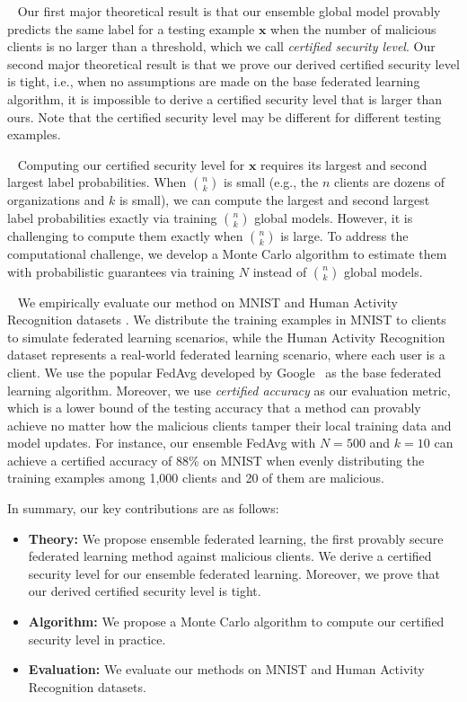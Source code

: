 \documentclass[letterpaper]{article} %
\newcommand{\myparatight}[1]{\smallskip\noindent{\bf {#1}:}~}
\begin{document}
\myparatight{Theory} Our first major theoretical result is that our ensemble global model provably predicts the same label for a testing example $\mathbf{x}$ when the number of malicious clients is no larger than a threshold, which we call \emph{certified security level}.  Our second major theoretical result is that we prove our derived certified security level is tight, i.e., when no assumptions are made on the base federated learning algorithm, it is impossible to derive a certified security level that is larger than ours. Note that the certified security level may be different for different testing examples.

\myparatight{Algorithm} Computing our certified security level for $\mathbf{x}$ requires its largest and second largest label probabilities. When ${n \choose k}$ is small (e.g., the $n$ clients are dozens of organizations \cite{kairouz2019advances} and $k$ is small), we can compute the largest and second largest label probabilities exactly via training ${n \choose k}$ global models.
However, it is challenging to compute them exactly when ${n \choose k}$ is large. To address the computational challenge, we develop a Monte Carlo algorithm to estimate them with probabilistic guarantees via training $N$ instead of ${n \choose k}$ global models.

\myparatight{Evaluation} We empirically evaluate our method on MNIST \cite{lecun2010mnist} and Human Activity Recognition datasets \cite{anguita2013public}. We distribute the training examples in MNIST to clients to simulate  federated learning scenarios, while the Human Activity Recognition dataset represents a real-world federated learning scenario, where each user is a client. We use the popular FedAvg developed by Google~\cite{mcmahan2016communication} as the base federated learning algorithm. Moreover, we use \emph{certified accuracy} as our evaluation metric, which is a lower bound of the testing accuracy that a method can provably achieve no matter how the malicious clients tamper their local training data and model updates. For instance, our ensemble FedAvg with $N=500$ and $k=10$ can achieve a certified accuracy of 88\% on MNIST when evenly distributing the training examples among 1,000 clients and 20 of them are malicious.

In summary, our key contributions are as follows:
\begin{itemize}
\item {\bf Theory:} We propose ensemble federated learning, the first provably secure federated learning method against malicious clients. We derive a certified security level for our ensemble federated learning. Moreover, we prove that our derived certified security level is tight.
\item {\bf Algorithm:} We propose a Monte Carlo algorithm to compute our certified security level in practice.
\item {\bf Evaluation:} We evaluate our methods on MNIST and Human Activity Recognition datasets.
\end{itemize}
\end{document}
